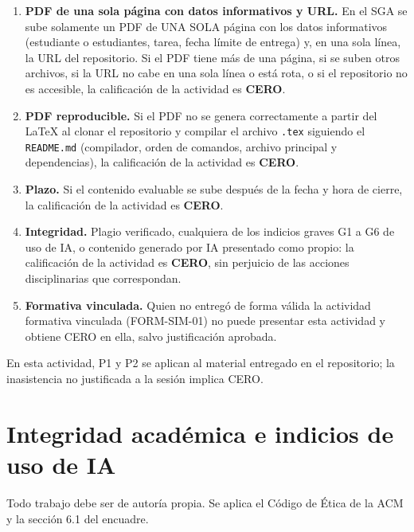 \documentclass[11pt]{article}
\newcommand{\seccion}[1]{\section{\textcolor{utegreendk}{#1}}}
\begin{document}
\begin{cajapiso}[title={Criterios de piso: su incumplimiento implica calificación CERO en la actividad}]
	\begin{enumerate}[label=\textbf{P\arabic*.},leftmargin=24pt,itemsep=3pt]
		\item \textbf{PDF de una sola página con datos informativos y URL.} En el SGA se sube solamente un PDF de UNA SOLA página con los datos informativos (estudiante o estudiantes, tarea, fecha límite de entrega) y, en una sola línea, la URL del repositorio. Si el PDF tiene más de una página, si se suben otros archivos, si la URL no cabe en una sola línea o está rota, o si el repositorio no es accesible, la calificación de la actividad es \textbf{CERO}.
		\item \textbf{PDF reproducible.} Si el PDF no se genera correctamente a partir del \LaTeX{} al clonar el repositorio y compilar el archivo \texttt{.tex} siguiendo el \texttt{README.md} (compilador, orden de comandos, archivo principal y dependencias), la calificación de la actividad es \textbf{CERO}.
		\item \textbf{Plazo.} Si el contenido evaluable se sube después de la fecha y hora de cierre, la calificación de la actividad es \textbf{CERO}.
		\item \textbf{Integridad.} Plagio verificado, cualquiera de los indicios graves G1 a G6 de uso de IA, o contenido generado por IA presentado como propio: la calificación de la actividad es \textbf{CERO}, sin perjuicio de las acciones disciplinarias que correspondan.
		\item \textbf{Formativa vinculada.} Quien no entregó de forma válida la actividad formativa vinculada (FORM-SIM-01) no puede presentar esta actividad y obtiene CERO en ella, salvo justificación aprobada.
	\end{enumerate}
	En esta actividad, P1 y P2 se aplican al material entregado en el repositorio; la inasistencia no justificada a la sesión implica CERO.
\end{cajapiso}

\seccion{Integridad académica e indicios de uso de IA}

Todo trabajo debe ser de autoría propia. Se aplica el Código de Ética de la ACM \citep{acm_code_2018} y la sección 6.1 del encuadre.
\end{document}
